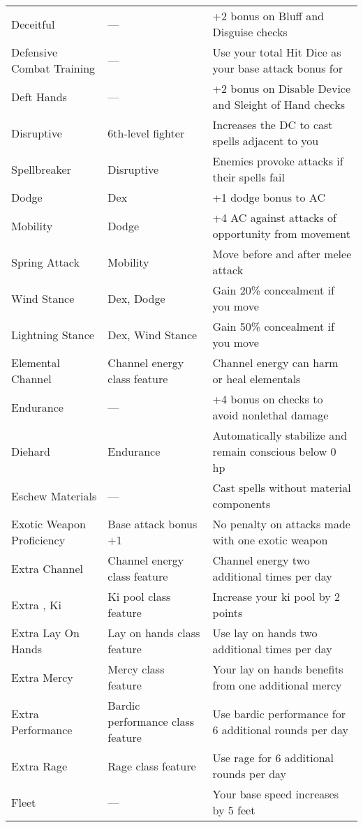 \begin{table}[]
\begin{tabular}{lll}
Deceitful & — & +2 bonus on Bluff and Disguise checks\\
Defensive Combat Training & — & Use your total Hit Dice as your base attack bonus for \\
Deft Hands & — & +2 bonus on Disable Device and Sleight of Hand checks\\
Disruptive & 6th-level fighter & Increases the DC to cast spells adjacent to you\\
\quad Spellbreaker & Disruptive & Enemies provoke attacks if their spells fail\\
Dodge & Dex & +1 dodge bonus to AC\\
\quad Mobility & Dodge & +4 AC against attacks of opportunity from movement\\
\quad \quad Spring Attack & Mobility & Move before and after melee attack\\
\quad Wind Stance & Dex, Dodge & Gain 20\% concealment if you move\\
\quad \quad Lightning Stance & Dex, Wind Stance & Gain 50\% concealment if you move\\
Elemental Channel & Channel energy class feature & Channel energy can harm or heal elementals\\
Endurance & — & +4 bonus on checks to avoid nonlethal damage\\
\quad Diehard & Endurance & Automatically stabilize and remain conscious below 0 hp\\
Eschew Materials & — & Cast spells without material components\\
Exotic Weapon Proficiency & Base attack bonus +1 & No penalty on attacks made with one exotic weapon\\
Extra Channel & Channel energy class feature & Channel energy two additional times per day\\
Extra , Ki & Ki pool class feature & Increase your ki pool by 2 points\\
Extra Lay On Hands & Lay on hands class feature & Use lay on hands two additional times per day\\
Extra Mercy & Mercy class feature & Your lay on hands benefits from one additional mercy\\
Extra Performance & Bardic performance class feature & Use bardic performance for 6 additional rounds per day\\
Extra Rage & Rage class feature & Use rage for 6 additional rounds per day\\
Fleet & — & Your base speed increases by 5 feet\\

\end{tabular}
\end{table}
